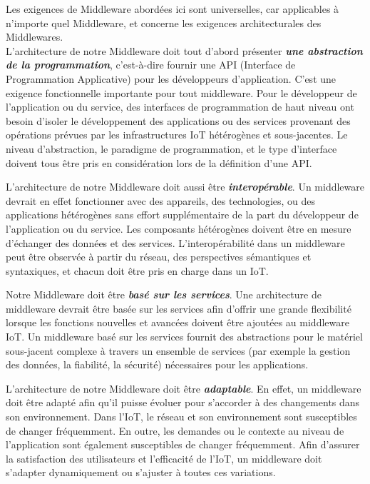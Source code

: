 Les exigences de Middleware abordées ici sont universelles, car applicables à n'importe quel Middleware, et concerne les exigences architecturales des Middlewares.
\\

L'architecture de notre Middleware doit tout d'abord présenter \textbf{\textit{une abstraction de la programmation}}, c'est-à-dire fournir une API (Interface de Programmation Applicative) pour les développeurs d'application. C'est une exigence fonctionnelle importante pour tout middleware. Pour le développeur de l'application ou du service, des interfaces de programmation de haut niveau ont besoin d'isoler le développement des applications ou des services provenant des opérations prévues par les infrastructures IoT hétérogènes et sous-jacentes. Le niveau d'abstraction, le paradigme de programmation, et le type d'interface doivent tous être pris en considération lors de la définition d'une API.

L'architecture de notre Middleware doit aussi être \textbf{\textit{interopérable}}. Un middleware devrait en effet fonctionner avec des appareils, des technologies, ou des applications hétérogènes sans effort supplémentaire de la part du développeur de l'application ou du service. Les composants hétérogènes doivent être en mesure d'échanger des données et des services. L'interopérabilité dans un middleware peut être observée à partir du réseau, des perspectives sémantiques et syntaxiques, et chacun doit être pris en charge dans un IoT.

Notre Middleware doit être \textbf{\textit{basé sur les services}}. Une architecture de middleware devrait être basée sur les services afin d’offrir une grande flexibilité lorsque les fonctions nouvelles et avancées doivent être ajoutées au middleware IoT. Un middleware basé sur les services fournit des abstractions pour le matériel sous-jacent complexe à travers un ensemble de services (par exemple la gestion des données, la fiabilité, la sécurité) nécessaires pour les applications.

L'architecture de notre Middleware doit être \textbf{\textit{adaptable}}. En effet, un middleware doit être adapté afin qu'il puisse évoluer pour s'accorder à des changements dans son environnement. Dans l'IoT, le réseau et son environnement sont susceptibles de changer fréquemment. En outre, les demandes ou le contexte au niveau de l'application sont également susceptibles de changer fréquemment. Afin d'assurer la satisfaction des utilisateurs et l'efficacité de l'IoT, un middleware doit s’adapter dynamiquement ou s'ajuster à toutes ces variations.

